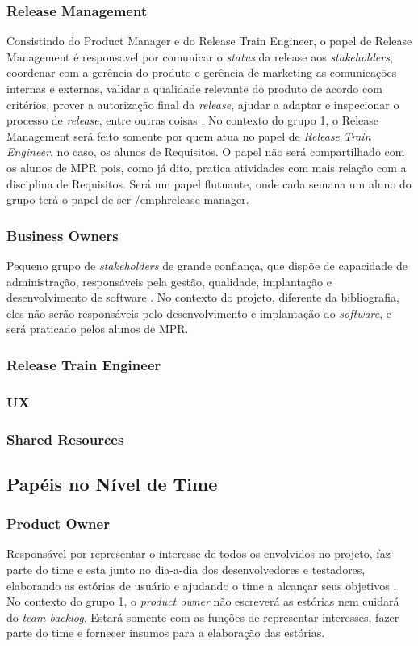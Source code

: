 \subsubsection{Release Management}
Consistindo do Product Manager e do Release Train Engineer, o papel de Release Management é responsavel por comunicar o \emph{status} da release aos \emph{stakeholders}, coordenar com a gerência do produto e gerência de marketing as comunicações internas e externas, validar a qualidade relevante do produto de acordo com critérios, prover a autorização final da \emph{release}, ajudar a adaptar e inspecionar o processo de \emph{release}, entre outras coisas \cite{safesite001}.
No contexto do grupo 1, o Release Management será feito somente por quem atua no papel de \emph{Release Train Engineer}, no caso, os alunos de Requisitos. O papel não será compartilhado com os alunos de MPR pois, como já dito, pratica atividades com mais relação com a disciplina de Requisitos. Será um papel flutuante, onde cada semana um aluno do grupo terá o papel de ser /emph{release manager}.

\subsubsection{Business Owners}
Pequeno grupo de \emph{stakeholders} de grande confiança, que dispõe de capacidade de administração, responsáveis pela gestão, qualidade, implantação e desenvolvimento de software \cite{safesite001}. No contexto do projeto, diferente da bibliografia, eles não serão responsáveis pelo desenvolvimento e implantação do \emph{software}, e será praticado pelos alunos de MPR.

\subsubsection{Release Train Engineer}
\subsubsection{UX}
\subsubsection{Shared Resources}

\subsection{Papéis no Nível de Time}

\subsubsection{Product Owner}
Responsável por representar o interesse de todos os envolvidos no projeto, faz parte do time e esta junto no dia-a-dia dos desenvolvedores e testadores, elaborando as estórias de usuário e ajudando o time a alcançar seus objetivos \cite[p. 47-48]{safe001}. No contexto do grupo 1, o \emph{product owner} não escreverá as estórias nem cuidará do \emph{team backlog}. Estará somente com as funções de representar interesses, fazer parte do time e fornecer insumos para a elaboração das estórias.

